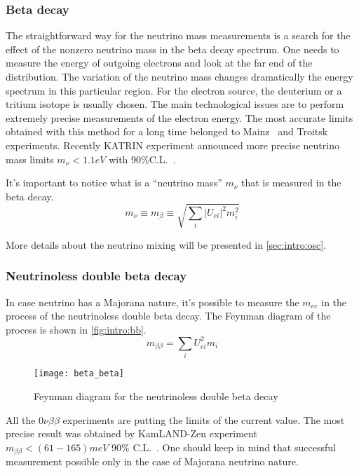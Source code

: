 \documentclass[../main.tex]{subfiles}
\begin{document}
\subsubsection{Beta decay}
The straightforward way for the neutrino mass measurements is a search for the effect of the nonzero neutrino mass in the beta decay spectrum. One needs to measure the energy of outgoing electrons and look at the far end of the distribution. The variation of the neutrino mass changes dramatically the energy spectrum in this particular region. For the electron source, the deuterium or a tritium isotope is usually chosen. The main technological issues are to perform extremely precise measurements of the electron energy. The most accurate limits obtained with this method for a long time belonged to Mainz~\cite{Kraus2005} and Troitsk~\cite{Aseev2011} experiments. Recently KATRIN experiment announced more precise neutrino mass limits $m_\nu < 1.1 eV$ with 90\%C.L.~\cite{Aker2019}.

It's important to notice what is a ``neutrino mass'' $m_\nu$ that is measured in the beta decay.
\begin{equation}
m_\nu\equiv m_\beta\equiv\sqrt{\sum_i\left|U_{ei}\right|^2m_i^2}
\end{equation}

More details about the neutrino mixing will be presented in \autoref{sec:intro:osc}.

\subsubsection{Neutrinoless double beta decay}
In case neutrino has a Majorana nature, it's possible to measure the $m_{ee}$ in the process of the neutrinoless double beta decay. The Feynman diagram of the process is shown in \autoref{fig:intro:bb}.
\begin{equation}
m_{\beta\beta}=\sum_i U^2_{ei}m_i
\end{equation}

\begin{figure}
  \centering
  \texttt{[image: beta\_beta]}
  \caption{Feynman diagram for the neutrinoless double beta decay}
  \label{fig:intro:bb}
\end{figure}

All the $0\nu\beta\beta$ experiments are putting the limits of the current value. The most precise result was obtained by KamLAND-Zen experiment $m_{\beta\beta} < (61-165) meV$ 90\% C.L.~\cite{Gando2016}. One should keep in mind that successful measurement possible only in the case of Majorana neutrino nature.
\end{document}
